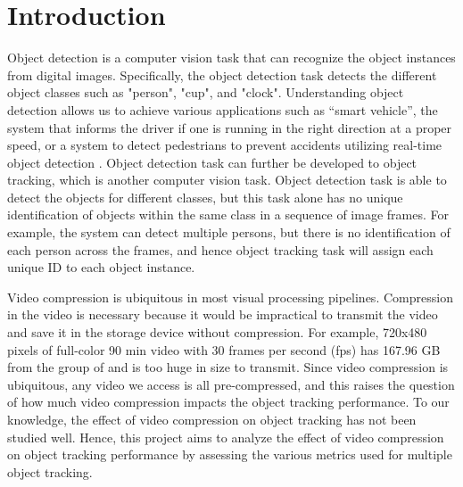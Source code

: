 \chapter{Introduction}
\label{chap:introduction}

Object detection is a computer vision task that can recognize the object instances from digital images. Specifically, the object detection task detects the different object classes such as "person", "cup", and "clock". Understanding object detection allows us to achieve various applications such as “smart vehicle”, the system that informs the driver if one is running in the right direction at a proper speed, or a system to detect pedestrians to prevent accidents utilizing real-time object detection \cite{gavrila_real-time_1999}. Object detection task can further be developed to object tracking, which is another computer vision task. Object detection task is able to detect the objects for different classes, but this task alone has no unique identification of objects within the same class in a sequence of image frames. For example, the system can detect multiple persons, but there is no identification of each person across the frames, and hence object tracking task will assign each unique ID to each object instance.

Video compression is ubiquitous in most visual processing pipelines. Compression in the video is necessary because it would be impractical to transmit the video and save it in the storage device without compression. For example, 720x480 pixels of full-color 90 min video with 30 frames per second (fps) has 167.96 GB from the group of \citeauthor{ponlatha_comparison_2013} \cite{ponlatha_comparison_2013} and is too huge in size to transmit. Since video compression is ubiquitous, any video we access is all pre-compressed, and this raises the question of how much video compression impacts the object tracking performance. To our knowledge, the effect of video compression on object tracking has not been studied well. Hence, this project aims to analyze the effect of video compression on object tracking performance by assessing the various metrics used for multiple object tracking.







